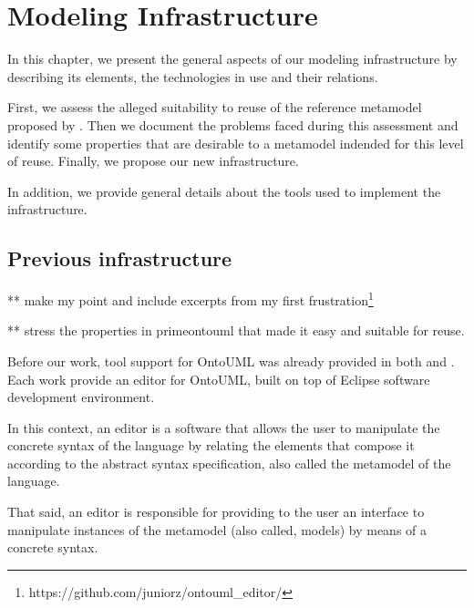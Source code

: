 \documentclass[
	10pt,				%
	oneside,
	a4paper,			%
	brazil,
	english
	]{abntex2}
\begin{document}
\chapter{Modeling Infrastructure}


In this chapter, we present the general aspects of our modeling infrastructure by
describing its elements, the technologies in use and their relations.

First, we assess the alleged suitability to reuse of the reference metamodel
proposed by \cite{carraretto10}.
%
%
Then we document the problems faced during this assessment and identify some
properties that are desirable to a metamodel indended for this level of reuse.
Finally, we propose our new infrastructure.

In addition, we provide general details about the tools used to implement the infrastructure.

\section{Previous infrastructure}

** make my point and include excerpts from my first frustration\footnote{https://github.com/juniorz/ontouml\_editor/}

** stress the properties in primeontouml that made it easy and suitable for reuse.

Before our work, tool support for OntoUML was already provided in both
\cite{benevides10} and \cite{carraretto10}. Each work provide an editor for
OntoUML, built on top of Eclipse software development environment.

In this context, an editor is a software that allows the user to manipulate the
concrete syntax of the language by relating the elements that compose it
according to the abstract syntax specification,
also called the metamodel of the language.

That said, an editor is responsible for providing to the user an interface to
manipulate instances of the metamodel (also called, models) by means of a
concrete syntax.
\end{document}
